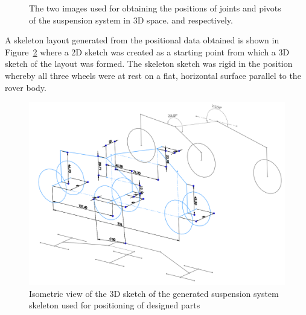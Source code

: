       \begin{figure}[H]
      \centering
      \qquad
      \caption[The two images used for obtaining the positions of joints and pivots of the suspension system in 3D space]{The two images used for obtaining the positions of joints and pivots of the suspension system in 3D space. \cite{fig:mechDesign-suspensionReferences1_cite} and \cite{fig:mechDesign-suspensionReferences2_cite} respectively.}
      \label{fig:mechDesign-suspensionReferences}
      \end{figure}

      A skeleton layout generated from the positional data obtained is shown in Figure~\ref{fig:mechDesign-suspension3d} where a 2D sketch was created as a starting point from which a 3D sketch of the layout was formed. The skeleton sketch was rigid in the position whereby all three wheels were at rest on a flat, horizontal surface parallel to the rover body.
            
      \begin{figure}[H]
        \centering
        \includegraphics[width=0.9\linewidth]{figures/suspension3D}
        \caption[Isometric view of the 3D sketch of the generated suspension system skeleton used for positioning of designed parts]{Isometric view of the 3D sketch of the generated suspension system skeleton used for positioning of designed parts}
        \label{fig:mechDesign-suspension3d}
      \end{figure}
      
